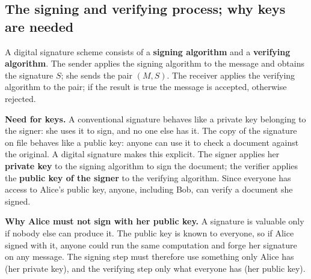 \subsection{The signing and verifying process; why keys are needed \hot\new}

A digital signature scheme consists of a \textbf{signing algorithm} and a \textbf{verifying algorithm}. The sender applies the signing algorithm to the message and obtains the signature $S$; she sends the pair $(M, S)$. The receiver applies the verifying algorithm to the pair; if the result is true the message is accepted, otherwise rejected.

\textbf{Need for keys.} A conventional signature behaves like a private key belonging to the signer: she uses it to sign, and no one else has it. The copy of the signature on file behaves like a public key: anyone can use it to check a document against the original. A digital signature makes this explicit. The signer applies her \textbf{private key} to the signing algorithm to sign the document; the verifier applies the \textbf{public key of the signer} to the verifying algorithm. Since everyone has access to Alice's public key, anyone, including Bob, can verify a document she signed.

\textbf{Why Alice must not sign with her public key.} A signature is valuable only if nobody else can produce it. The public key is known to everyone, so if Alice signed with it, anyone could run the same computation and forge her signature on any message. The signing step must therefore use something only Alice has (her private key), and the verifying step only what everyone has (her public key). 

\begin{center}
\end{center}

